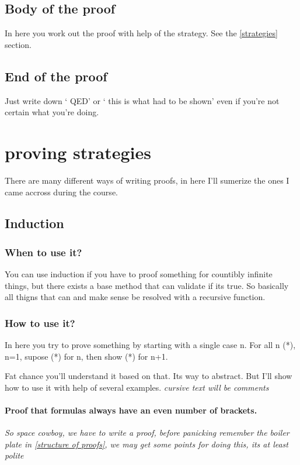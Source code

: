 \documentclass{article}
\begin{document}
\subsection{Body of the proof}
In here you work out the proof with help of the strategy.
See the \autoref{strategies} section.

\subsection{End of the proof}
Just write down ` QED' or ` this is what had to be shown' even if you're not
certain what you're doing.

\section{proving strategies}
\label{strategies}
There are many different ways of writing proofs, in here I'll sumerize the ones
I came accross during the course.

\subsection{Induction}
\label{induction}
\subsubsection{When to use it?}
You can use induction if you have to proof something for countibly infinite
things, but there exists a base method that can validate if its true.
So basically all thigns that can and make sense be resolved with a
recursive function.

\subsubsection{How to use it?}
In here you try to prove something by starting with a single case n.
For all n (*), n=1, supose (*) for n, then show (*) for n+1.

Fat chance you'll understand it based on that. Its way to abstract.
But I'll show how to use it with help of several examples. \emph{cursive
text will be comments}

\paragraph{Proof that formulas always have an even number of brackets.}
\emph{So space cowboy, we have to write a proof, before panicking remember
	the boiler plate in \autoref{structure of proofs}, we may get some
points for doing this, its at least polite}
\end{document}
